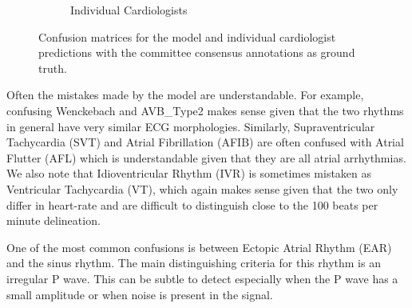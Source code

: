 \begin{figure}
\begin{subfigure}{.5\textwidth}
  \caption{Individual Cardiologists}
  \label{fig:arrhythmia:human_confusion}
\end{subfigure}
\caption{Confusion matrices for the model and individual cardiologist
         predictions with the committee consensus annotations as ground
         truth.}
\end{figure}

Often the mistakes made by the model are understandable. For example, confusing
Wenckebach and AVB\_Type2 makes sense given that the two rhythms in general
have very similar ECG morphologies. Similarly, Supraventricular Tachycardia
(SVT) and Atrial Fibrillation (AFIB) are often confused with Atrial Flutter
(AFL) which is understandable given that they are all atrial arrhythmias. We
also note that Idioventricular Rhythm (IVR) is sometimes mistaken as
Ventricular Tachycardia (VT), which again makes sense given that the two only
differ in heart-rate and are difficult to distinguish close to the 100 beats
per minute delineation.

One of the most common confusions is between Ectopic Atrial Rhythm (EAR) and
the sinus rhythm. The main distinguishing criteria for this rhythm is an
irregular P wave. This can be subtle to detect especially when the P wave has a
small amplitude or when noise is present in the signal.
